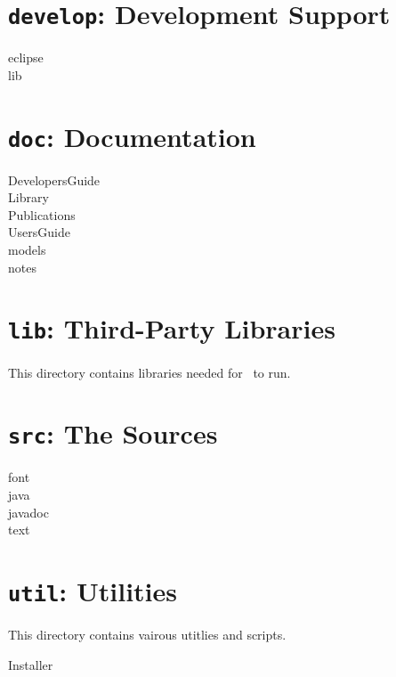 \section{\texttt{develop}: Development Support}

\begin{description}
\item[eclipse] 
\item[lib] 
\end{description}

\section{\texttt{doc}: Documentation}

\begin{description}
\item[DevelopersGuide] 
\item[Library] 
\item[Publications] 
\item[UsersGuide] 
\item[models] 
\item[notes] 
\end{description}

\section{\texttt{lib}: Third-Party Libraries}

This directory contains libraries needed for \ExTeX\ to run.

\section{\texttt{src}: The Sources}

\begin{description}
\item[font] 
\item[java] 
\item[javadoc] 
\item[text] 
\end{description}

\section{\texttt{util}: Utilities}

This directory contains vairous utitlies and scripts.

\begin{description}
\item[Installer] 
\end{description}

